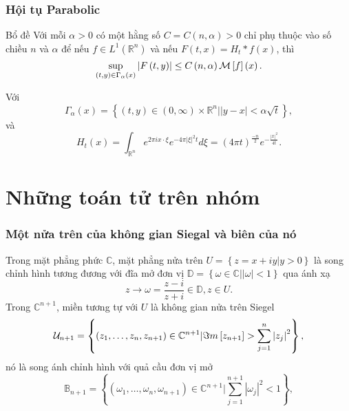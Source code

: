 \documentclass[11pt]{beamer}
\numberwithin{equation}{section}
\theoremstyle{plain}
\theoremstyle{definition}
\theoremstyle{remark}
\begin{document}
\begin{frame}\frametitle{Hội tụ Parabolic}
\begin{block}{Bổ đề\label{3.3}}
Với mỗi	$\alpha>0$ có một hằng số $C=C\left(n,\alpha\right)>0$ chỉ phụ thuộc vào số chiều $n$ và $\alpha$ để nếu $f\in L^{1}\left(\mathbb{R}^{n}\right)$ và nếu $F\left(t,x\right)=H_{t}*f\left(x\right)$, thì
\[\mathop {\sup }\limits_{\left( {t,y} \right) \in {\Gamma _\alpha }\left( x \right)} \left| {F\left( {t,y} \right)} \right| \le C\left( {n,\alpha } \right){\cal M}\left[ f \right]\left( x \right).\]
\end{block}
\begin{block}{}
Với \[{\Gamma _\alpha }\left( x \right) = \left\{ {\left( {t,y} \right) \in \left( {0,\infty } \right) \times {\mathbb{R}^n}|\left| {y - x} \right| < \alpha \sqrt t } \right\},\] và
\[{H_t}\left( x \right) = \int_{{\mathbb{R}^n}} {{e^{2\pi ix \cdot \xi }}{e^{ - 4\pi {{\left| \xi  \right|}^2}t}}d\xi }  = {\left( {4\pi t} \right)^{\frac{{ - n}}{2}}}{e^{ - \frac{{{{\left| x \right|}^2}}}{{4t}}}}.\]
\end{block}
\end{frame}

\section{Những toán tử trên nhóm }

\begin{frame}\frametitle{Một nửa trên của không gian Siegal và biên của nó}
Trong mặt phẳng phức $\mathbb{C}$, mặt phẳng nửa trên $U = \left\{ {z = x + iy|y > 0} \right\}$ là song chỉnh hình tương đương với đĩa mở đơn vị $\mathbb{D}=\left\{\omega\in\mathbb{C}|\left|\omega\right|<1\right\}$ qua ánh xạ 
\[z \to \omega  = \frac{{z - i}}{{z + i}} \in\mathbb{D} , z \in U.\]
Trong $\mathbb{C}^{n+1}$, miền tương tự với $U$ là không gian nửa trên Siegel
\[{{\cal U}_{n + 1}} = \left\{ {\left( {{z_1}, \ldots ,{z_n},{z_{n + 1}}} \right) \in {\mathbb{C}^{n + 1}}|\Im m\left[ {{z_{n + 1}}} \right] > \sum\limits_{j = 1}^n {{{\left| {{z_j}} \right|}^2}} } \right\},\]
nó là song ánh chỉnh hình với quả cầu đơn vị mở
\[{\mathbb{B}_{n+ 1}} = \left\{ {\left( {{\omega _1}, \ldots ,{\omega _n},{\omega _{n + 1}}} \right) \in {\mathbb{C}^{n + 1}}|\sum\limits_{j = 1}^{n + 1} {{{\left| {{\omega _j}} \right|}^2} < 1} } \right\},\]
\end{frame}
\end{document}
